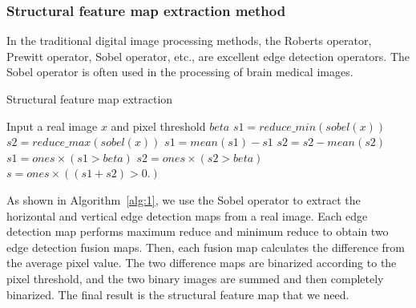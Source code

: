 \documentclass[runningheads]{llncs}
\begin{document}
\subsubsection{Structural feature map extraction method}
In the traditional digital image processing methods, the Roberts operator, Prewitt operator, Sobel operator, etc., are excellent edge detection operators. The Sobel operator is often used in the processing of brain medical images.
\begin{algorithm}
	\caption{Structural feature map extraction}
	\label{alg:1}
	\begin{algorithmic}[1]
		\State Input a real image $x$ and pixel threshold $beta$
		\State $s1 = reduce\_min(sobel(x))$
		\State $s2 = reduce\_max(sobel(x))$
		\State $s1 = mean(s1) - s1$
		\State $s2 = s2 - mean(s2)$
		\State $s1 = ones \times (s1 > beta)$
		\State $s2 = ones \times (s2 > beta)$
		\State $s = ones \times ((s1 + s2)> 0.)$
	\end{algorithmic}  
\end{algorithm}
As shown in Algorithm~\ref{alg:1}, we use the Sobel operator to extract the horizontal and vertical edge detection maps from a real image. Each edge detection map performs maximum reduce and minimum reduce to obtain two edge detection fusion maps. Then, each fusion map calculates the difference from the average pixel value. The two difference maps are binarized according to the pixel threshold, and the two binary images are summed and then completely binarized. The final result is the structural feature map that we need.
\end{document}
